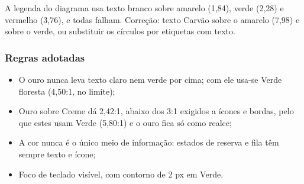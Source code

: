 A legenda do diagrama usa texto branco sobre amarelo (1,84), verde (2,28) e vermelho (3,76), e todas falham. Correção: texto Carvão
sobre o amarelo (7,98) e sobre o verde, ou substituir os círculos por etiquetas com texto.

\subsubsection{Regras adotadas}

\begin{itemize}
    \item O ouro nunca leva texto claro nem verde por cima; com ele usa-se Verde floresta (4,50:1, no limite);
    \item Ouro sobre Creme dá 2,42:1, abaixo dos 3:1 exigidos a ícones e bordas, pelo que estes usam Verde (5,80:1) e o ouro fica só como realce;
    \item A cor nunca é o único meio de informação: estados de reserva e fila têm sempre texto e ícone;
    \item Foco de teclado visível, com contorno de 2 px em Verde.
\end{itemize}